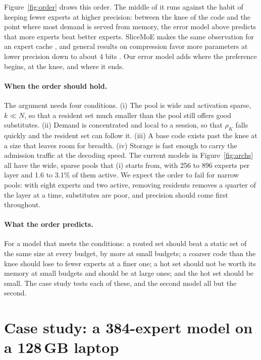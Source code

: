 \documentclass[11pt]{article}
\begin{document}
Figure~\ref{fig:order} draws this order. The middle of it runs against the habit of keeping
fewer experts at higher precision:
between the knee of the code and the point where most demand is served from memory, the error model above predicts that more experts beat better experts. SliceMoE makes the same observation for an expert
cache \citep{choi2025slicemoe}, and general results on compression favor more parameters at lower
precision down to about 4 bits \citep{dettmers2022case,kuzmin2023pruning}. Our error model adds where the preference begins, at the knee, and where it ends.

\paragraph{When the order should hold.} The argument needs four conditions. (i) The pool is
wide and activation sparse, $k\ll N$, so that a resident set much smaller than the pool still
offers good substitutes. (ii) Demand is concentrated and local to a session, so that
$\rho_K$ falls quickly and the resident set can follow it. (iii) A base code exists past the
knee at a size that leaves room for breadth. (iv) Storage is fast enough to carry the admission
traffic at the decoding speed. The current models in Figure~\ref{fig:archs} all have the wide, sparse pools that (i) starts from, with 256 to 896 experts per layer and 1.6 to 3.1\% of them active. We expect the order to fail for narrow pools: with eight experts and two active, removing
residents removes a quarter of the layer at a time, substitutes are poor, and precision should
come first throughout.

\paragraph{What the order predicts.} For a model that meets the conditions: a routed set
should beat a static set of the same size at every budget, by more at small budgets; a coarser
code than the knee should lose to fewer experts at a finer one; a hot set should not be worth its memory at small budgets and should be at large ones; and the hot set should be small. The case study
tests each of these, and the second model all but the second.

\FloatBarrier
\section{Case study: a 384-expert model on a 128\,GB laptop}
\label{sec:case}
\end{document}
